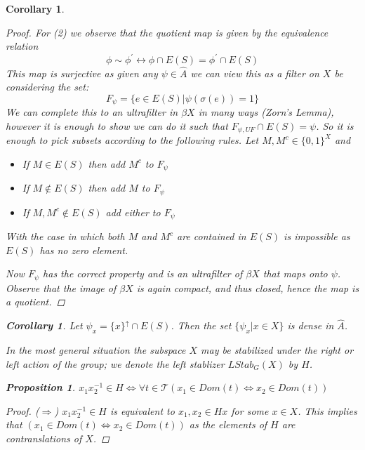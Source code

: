 \documentclass[11pt]{amsart}
\theoremstyle{plain}
\newtheorem{proposition}[theorem]{Proposition}%
\newtheorem{corollary}[theorem]{Corollary}%
\theoremstyle{definition}%
\theoremstyle{remark}%
\newcommand{\A}{\widehat{A}}
\begin{document}
\begin{corollary}
\begin{proof}
For (2) we observe that the quotient map is given by the equivalence relation 
\begin{equation*}
\phi \sim \phi^{'} \leftrightarrow \phi \cap E(S) = \phi^{'} \cap E(S)
\end{equation*}
This map is surjective as given any $\psi \in \A$ we can view this as a filter on $X$ be considering the set:
\begin{equation*}
F_{\psi} = \lbrace e \in E(S) | \psi(\sigma(e))=1 \rbrace
\end{equation*}
We can complete this to an ultrafilter in $\beta X$ in many ways (Zorn's Lemma), however it is enough to show we can do it such that $F_{\psi ,UF}\cap E(S) = \psi$. So it is enough to pick subsets according to the following rules. Let $M,M^{c} \in \lbrace 0,1 \rbrace^{X}$ and
\begin{itemize}
\item If $M \in E(S)$ then add $M^{c}$ to $F_{\psi}$
\item If $M \not\in E(S)$ then add $M$ to $F_{\psi}$
\item If $M,M^{c} \not \in E(S)$ add either to $F_{\psi}$
\end{itemize}
With the case in which both $M$ and $M^{c}$ are contained in $E(S)$ is impossible as $E(S)$ has no zero element.

Now $F_{\psi}$ has the correct property and is an ultrafilter of $\beta X$ that maps onto $\psi$. Observe that the image of $\beta X$ is again compact, and thus closed, hence the map is a quotient.
\end{proof}

\begin{corollary}\label{cor:C3}
Let $\psi_{x} = \lbrace x \rbrace^{\uparrow} \cap E(S)$. Then the set $\lbrace \psi_{x} | x \in X \rbrace$ is dense in $\A$.
\end{corollary}

In the most general situation the subspace $X$ may be stabilized under the right or left action of the group; we denote the left stablizer $LStab_{G}(X)$ by $H$. 

\begin{proposition}\label{prop:P9a}
$x_{1}x_{2}^{-1} \in H \Leftrightarrow \forall t \in \mathcal{T} (x_{1} \in Dom(t) \Leftrightarrow x_{2} \in Dom(t))$
\end{proposition}
\begin{proof}
($\Rightarrow$) $x_{1}x_{2}^{-1} \in H$ is equivalent to $x_{1}, x_{2} \in Hx$ for some $x \in X$. This implies that $(x_{1} \in Dom(t) \Leftrightarrow x_{2} \in Dom(t))$ as the elements of $H$ are contranslations of $X$. 


\end{proof}
\end{corollary}
\end{document}
